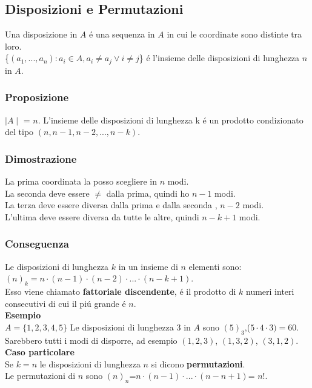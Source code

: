 \documentclass[11pt]{article}
\begin{document}
            \subsection{Disposizioni e Permutazioni}
            Una disposizione in $A$ \'e una sequenza in $A$ in cui le coordinate sono distinte tra loro.\\
            \{$(a_1,...,a_n):a_i \in A, a_i \neq a_j \vee i \neq j$\} \'e l'insieme delle disposizioni di lunghezza $n$ in $A$.
            \subsubsection{Proposizione}
            $\mid A \mid$ = $n$. L'insieme delle disposizioni di lunghezza k \'e un prodotto condizionato del tipo $(n,n-1,n-2,...,n-k)$.
            \subsubsection{Dimostrazione}
            La prima coordinata la posso scegliere in $n$ modi.\\
            La seconda deve essere $\neq$ dalla prima, quindi ho $n-1$ modi.\\
            La terza deve essere diversa dalla prima e dalla seconda , $n-2$ modi.\\
            L'ultima deve essere diversa da tutte le altre, quindi $n-k+1$ modi.
            \subsubsection{Conseguenza}
            Le disposizioni di lunghezza $k$ in un insieme di $n$ elementi sono:\\
            $(n)_k = n\cdot(n-1)\cdot(n-2)\cdot...\cdot(n-k+1)$.\\
            Esso viene chiamato \textbf{fattoriale discendente}, \'e il prodotto di $k$ numeri interi consecutivi di cui il pi\'u grande \'e $n$.\\
            \textbf{Esempio}\\
            $A=\{1,2,3,4,5\}$ Le disposizioni di lunghezza $3$ in $A$ sono $(5)_3$,($5\cdot4\cdot3)=60$. Sarebbero tutti i modi di disporre, ad esempio $(1,2,3)$, $(1,3,2)$, $(3,1,2)$.\\
            \textbf{Caso particolare}\\
            Se $k=n$ le disposizioni di lunghezza $n$ si dicono \textbf{permutazioni}.\\
            Le permutazioni di $n$ sono $(n)_n$=$n\cdot(n-1)\cdot...\cdot(n-n+1)$= $n!$.
\end{document}
